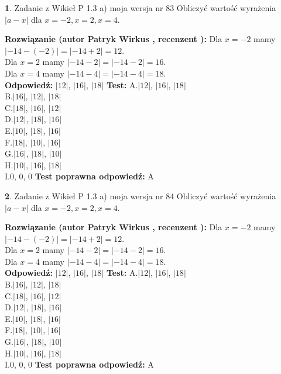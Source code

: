 \documentclass[12pt, a4paper]{article}
\theoremstyle{definition} %
\newtheorem{zad}{}
\newcommand{\zadStart}[1]{\begin{zad}#1\newline}
\newcommand{\zadStop}{\end{zad}}
\newcommand{\rozwStart}[2]{\noindent \textbf{Rozwiązanie (autor #1 , recenzent #2): }\newline}
\newcommand{\rozwStop}{\newline}
\newcommand{\odpStart}{\noindent \textbf{Odpowiedź:}\newline}
\newcommand{\odpStop}{\newline}
\newcommand{\testStart}{\noindent \textbf{Test:}\newline}
\newcommand{\testStop}{\newline}
\newcommand{\kluczStart}{\noindent \textbf{Test poprawna odpowiedź:}\newline}
\newcommand{\kluczStop}{\newline}
\begin{document}
\zadStart{Zadanie z Wikieł P 1.3 a) moja wersja nr 83}
Obliczyć wartość wyrażenia $|a - x|$ dla $x=-2,x=2,x=4$.
\zadStop
\rozwStart{Patryk Wirkus}{}
Dla $x = -2$ mamy $|-14 - (-2)| = |-14 + 2| = 12$.\\
Dla $x = 2$ mamy $|-14 - 2| = |-14 - 2| = 16$.\\
Dla $x = 4$ mamy $|-14 - 4| = |-14 - 4| = 18$.\\
\rozwStop
\odpStart
$|12|$, $|16|$, $|18|$
\odpStop
\testStart
A.$|12|$, $|16|$, $|18|$\\
B.$|16|$, $|12|$, $|18|$\\
C.$|18|$, $|16|$, $|12|$\\
D.$|12|$, $|18|$, $|16|$\\
E.$|10|$, $|18|$, $|16|$\\
F.$|18|$, $|10|$, $|16|$\\
G.$|16|$, $|18|$, $|10|$\\
H.$|10|$, $|16|$, $|18|$\\
I.$0$, $0$, $0$
\testStop
\kluczStart
A
\kluczStop



\zadStart{Zadanie z Wikieł P 1.3 a) moja wersja nr 84}
Obliczyć wartość wyrażenia $|a - x|$ dla $x=-2,x=2,x=4$.
\zadStop
\rozwStart{Patryk Wirkus}{}
Dla $x = -2$ mamy $|-14 - (-2)| = |-14 + 2| = 12$.\\
Dla $x = 2$ mamy $|-14 - 2| = |-14 - 2| = 16$.\\
Dla $x = 4$ mamy $|-14 - 4| = |-14 - 4| = 18$.\\
\rozwStop
\odpStart
$|12|$, $|16|$, $|18|$
\odpStop
\testStart
A.$|12|$, $|16|$, $|18|$\\
B.$|16|$, $|12|$, $|18|$\\
C.$|18|$, $|16|$, $|12|$\\
D.$|12|$, $|18|$, $|16|$\\
E.$|10|$, $|18|$, $|16|$\\
F.$|18|$, $|10|$, $|16|$\\
G.$|16|$, $|18|$, $|10|$\\
H.$|10|$, $|16|$, $|18|$\\
I.$0$, $0$, $0$
\testStop
\kluczStart
A
\kluczStop
\end{document}
